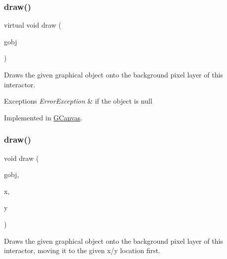 \subsubsection{\texorpdfstring{draw()}{draw()}\hspace{0.1cm}{\footnotesize\ttfamily [1/4]}}
{\footnotesize\ttfamily virtual void draw (\begin{DoxyParamCaption}\item[{\mbox{\hyperlink{classsgl_1_1GObject}{G\+Object}} $\ast$}]{gobj }\end{DoxyParamCaption})\hspace{0.3cm}{\ttfamily [pure virtual]}}



Draws the given graphical object onto the background pixel layer of this interactor. 


\begin{DoxyExceptions}{Exceptions}
{\em Error\+Exception} & if the object is null \\
\hline
\end{DoxyExceptions}


Implemented in \mbox{\hyperlink{classsgl_1_1GCanvas_a7f7f6c1798bcedfd52151b458074e8a0}{G\+Canvas}}.

\mbox{\label{classsgl_1_1GDrawingSurface_acc3825d7a24815d1e2f78e7c3ffea6cc}} 
\subsubsection{\texorpdfstring{draw()}{draw()}\hspace{0.1cm}{\footnotesize\ttfamily [2/4]}}
{\footnotesize\ttfamily void draw (\begin{DoxyParamCaption}\item[{\mbox{\hyperlink{classsgl_1_1GObject}{G\+Object}} $\ast$}]{gobj,  }\item[{double}]{x,  }\item[{double}]{y }\end{DoxyParamCaption})\hspace{0.3cm}{\ttfamily [virtual]}}



Draws the given graphical object onto the background pixel layer of this interactor, moving it to the given x/y location first. 


